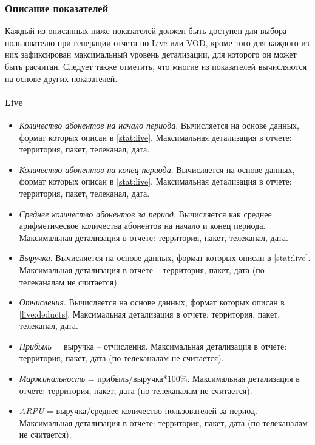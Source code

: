 \subsubsection{Описание показателей}
Каждый из описанных ниже показателей должен быть доступен для выбора пользователю при генерации
отчета по Live или VOD, кроме того для каждого из них зафиксирован максимальный уровень детализации,
для которого он может быть расчитан. Следует также отметить, что многие из показателей вычисляются
на основе других показателей.

\paragraph{Live}
\begin{itemize}
\item{
\textit{Количество абонентов на начало периода}. Вычисляется на основе данных, формат которых описан в \ref{stat:live}.
 Максимальная детализация в отчете: территория, пакет, телеканал, дата.
}
\item{
\textit{Количество абонентов на конец периода}. Вычисляется на основе данных, формат которых описан в \ref{stat:live}.
Максимальная детализация в отчете: территория, пакет, телеканал, дата.
}
\item{
\textit{Среднее количество абонентов за период}.  Вычисляется как среднее арифметическое количества абонентов на начало 
и конец периода. Максимальная детализация в отчете: территория, пакет, телеканал, дата.
}
\item{
\textit{Выручка}. Вычисляется на основе данных, формат которых описан в \ref{stat:live}.
Максимальная детализация в отчете – территория, пакет, дата (по телеканалам не считается).
}
\item{
\textit{Отчисления}. Вычисляется на основе данных, формат которых описан в \ref{live:deducts}.
Максимальная детализация в отчете: территория, пакет, телеканал, дата.
}
\item{
\textit{Прибыль} = выручка – отчисления. Максимальная детализация в отчете: территория, пакет, дата (по телеканалам не считается). 
}
\item{
\textit{Маржинальность} = прибыль/выручка*100\%. Максимальная детализация в отчете: территория, пакет, дата (по телеканалам не считается).
}
\item{
\textit{ARPU} = выручка/среднее количество пользователей за период. Максимальная детализация в отчете: территория, пакет, дата (по телеканалам не считается).
}
\end{itemize}

